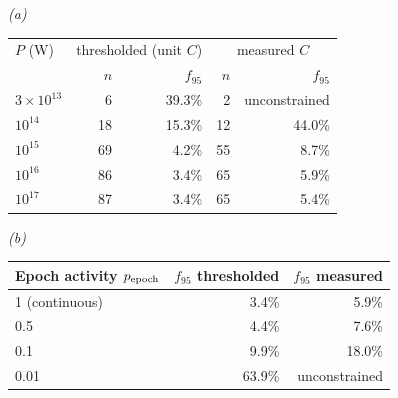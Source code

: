 \emph{(a)}\\[2pt]
\begin{tabular}{@{}lrrrr@{}}
\toprule
$P$ (W) & \multicolumn{2}{c}{thresholded (unit $C$)} &
\multicolumn{2}{c}{measured $C$} \\
 & $n$ & $f_{95}$ & $n$ & $f_{95}$ \\
\midrule
$3\times10^{13}$ & 6 & 39.3\% & 2 & unconstrained \\
$10^{14}$ & 18 & 15.3\% & 12 & 44.0\% \\
$10^{15}$ & 69 & 4.2\% & 55 & 8.7\% \\
$10^{16}$ & 86 & 3.4\% & 65 & 5.9\% \\
$10^{17}$ & 87 & 3.4\% & 65 & 5.4\% \\
\bottomrule
\end{tabular}

\smallskip
\emph{(b)}\\[2pt]
\begin{tabular}{@{}lrr@{}}
\toprule
Epoch activity $p_{\rm epoch}$ & $f_{95}$ thresholded & $f_{95}$ measured \\
\midrule
1 (continuous) & 3.4\% & 5.9\% \\
0.5 & 4.4\% & 7.6\% \\
0.1 & 9.9\% & 18.0\% \\
0.01 & 63.9\% & unconstrained \\
\bottomrule
\end{tabular}
